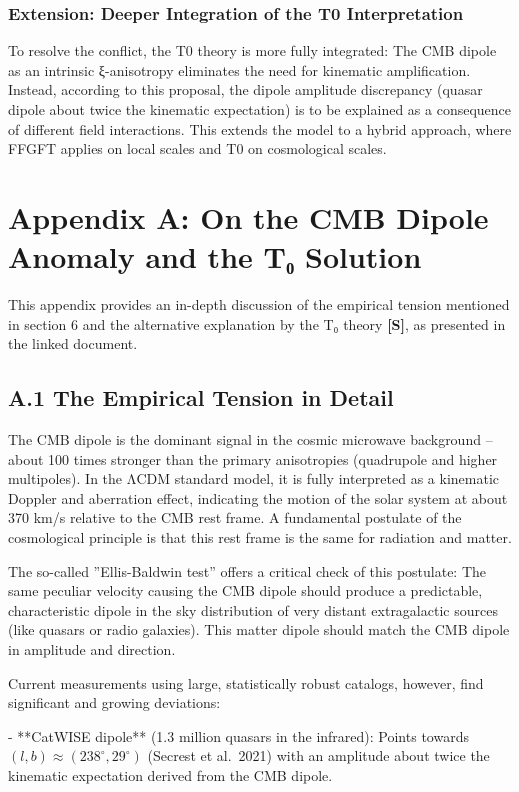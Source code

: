 	\subsubsection*{Extension: Deeper Integration of the T0 Interpretation}
	To resolve the conflict, the T0 theory is more fully integrated: The CMB dipole as an intrinsic ξ-anisotropy eliminates the need for kinematic amplification. Instead, according to this proposal, the dipole amplitude discrepancy (quasar dipole about twice the kinematic expectation) is to be explained as a consequence of different field interactions. This extends the model to a hybrid approach, where FFGFT applies on local scales and T0 on cosmological scales.
	
	\section*{Appendix A: On the CMB Dipole Anomaly and the T₀ Solution}
	
	This appendix provides an in-depth discussion of the empirical tension mentioned in section 6 and the alternative explanation by the T₀ theory \textbf{[S]}, as presented in the linked document.
	
	\subsection*{A.1 The Empirical Tension in Detail}
	
	The CMB dipole is the dominant signal in the cosmic microwave background – about 100 times stronger than the primary anisotropies (quadrupole and higher multipoles). In the ΛCDM standard model, it is fully interpreted as a kinematic Doppler and aberration effect, indicating the motion of the solar system at about 370 km/s relative to the CMB rest frame. A fundamental postulate of the cosmological principle is that this rest frame is the same for radiation and matter.
	
	The so-called ''Ellis-Baldwin test'' offers a critical check of this postulate: The same peculiar velocity causing the CMB dipole should produce a predictable, characteristic dipole in the sky distribution of very distant extragalactic sources (like quasars or radio galaxies). This matter dipole should match the CMB dipole in amplitude and direction.
	
	Current measurements using large, statistically robust catalogs, however, find significant and growing deviations:
	
	- **CatWISE dipole** (1.3 million quasars in the infrared): Points towards $(l, b) \approx (238^\circ, 29^\circ)$ (Secrest et al.\ 2021) with an amplitude about twice the kinematic expectation derived from the CMB dipole.
	
